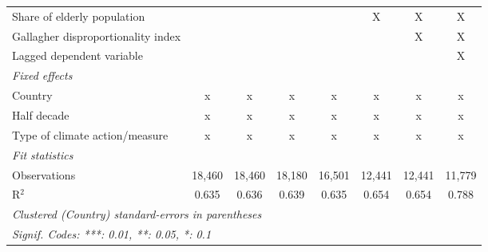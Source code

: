 \begin{tabular}{lccccccc}
   Share of elderly population                                       &                &               &               &               & X              & X              & X\\  
   Gallagher disproportionality index                                &                &               &               &               &                & X              & X\\  
   Lagged dependent variable                                         &                &               &               &               &                &                & X\\  
   \emph{Fixed effects}\\
   Country                                                           & x              & x             & x             & x             & x              & x              & x\\  
   Half decade                                                       & x              & x             & x             & x             & x              & x              & x\\  
   Type of climate action/measure                                    & x              & x             & x             & x             & x              & x              & x\\  
   \midrule \emph{Fit statistics}\\
   Observations                                                      & 18,460         & 18,460        & 18,180        & 16,501        & 12,441         & 12,441         & 11,779\\  
   R$^2$                                                             & 0.635          & 0.636         & 0.639         & 0.635         & 0.654          & 0.654          & 0.788\\  
   \midrule
   \multicolumn{8}{l}{\emph{Clustered (Country) standard-errors in parentheses}}\\
   \multicolumn{8}{l}{\emph{Signif. Codes: ***: 0.01, **: 0.05, *: 0.1}}\\
\end{tabular}
\par\endgroup


